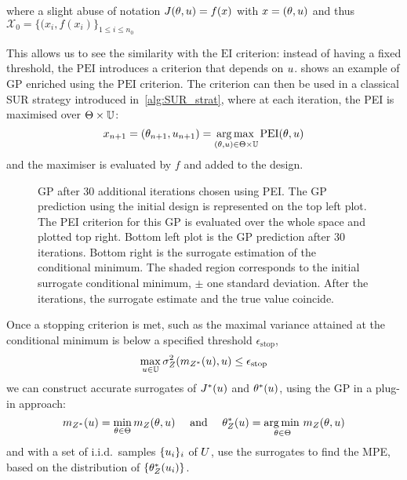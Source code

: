 \documentclass[../../Main_ManuscritThese.tex]{subfiles}
\newcommand\imgpath{/home/victor/acadwriting/Manuscrit/Text/Chapter4/img/}
\begin{document}
where a slight abuse of notation $J(\theta, u) = f(x)$ with
$x=(\theta, u)$ and thus
$\mathcal{X}_0 = \{(x_i, f(x_i)\}_{1\leq i\leq n_0}$

This allows us to see the similarity with the $\mathrm{EI}$
criterion: instead of having a fixed threshold, the $\mathrm{PEI}$
introduces a criterion that depends on $u$. 
shows an example of GP enriched using the $\mathrm{PEI}$ criterion.
The criterion can then be used in a classical SUR strategy introduced
in~\cref{alg:SUR_strat}, where at each iteration, the PEI is maximised
over $\Theta \times \mathbb{U}$:
\begin{equation}
  \label{eq:PEI_criterion_SUR}
  x_{n+1}=(\theta_{n+1}, u_{n+1}) =\operatorname*{arg\,max \,}_{(\theta, u)\in \Theta \times \mathbb{U}} \mathrm{PEI}(\theta, u)
\end{equation}
and the maximiser is evaluated by $f$ and added to the design.
\begin{figure}[ht]
  \centering
  
  \caption[Illustration of enrichment using the PEI
  criterion]{\label{fig:example_PEI} GP after 30 additional iterations
    chosen using PEI. The GP prediction using the initial design is
    represented on the top left plot. The PEI criterion for this
    GP is evaluated over the whole space and plotted top right. Bottom
    left plot is the GP prediction after 30 iterations. Bottom right
    is the surrogate estimation of the conditional minimum. The shaded
    region corresponds to the initial surrogate conditional minimum,
    $\pm$ one standard deviation. After the iterations, the surrogate
    estimate and the true value coincide.}
\end{figure}
Once a stopping criterion is met, such as the maximal variance
attained at the conditional minimum is below a specified threshold
$\epsilon_{\mathrm{stop}}$,
\begin{equation}
  \max_{u\in\mathbb{U}} \sigma^2_Z(m_{Z^*}(u), u) \leq \epsilon_{\mathrm{stop}}
\end{equation}
we can construct accurate surrogates of $J^*(u)$ and $\theta^*(u)$,
using the GP in a plug-in approach:
\begin{equation}
 m_{Z^*}(u) = \min_{\theta\in\Theta} m_Z(\theta,u)  \quad \text{ and } \quad \theta_Z^*(u) =\operatorname*{arg\,min \,}_{\theta\in\Theta} m_Z(\theta, u)
\end{equation}
and with a set of i.i.d.\ samples $\{u_i\}_i$ of $U$, use the
surrogates to find the MPE, based on the distribution of
$\{\theta_Z^*(u_i)\}$.
\end{document}
